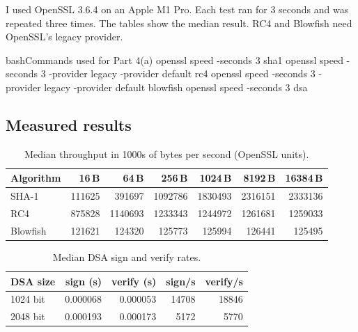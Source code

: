             I used OpenSSL 3.6.4 on an Apple M1 Pro. Each test ran for 3 seconds and was
            repeated three times. The tables show the median result. RC4 and Blowfish need
            OpenSSL's legacy provider.

            \begin{codeblock}[]{bash}{Commands used for Part 4(a)}
                openssl speed -seconds 3 sha1
                openssl speed -seconds 3 -provider legacy -provider default rc4
                openssl speed -seconds 3 -provider legacy -provider default blowfish
                openssl speed -seconds 3 dsa
            \end{codeblock}

        \subsection{Measured results}

            \begin{table}[h]
                \centering
                \small
                \begin{tabular}{lrrrrrr}
                    \toprule
                    Algorithm & 16\,B & 64\,B & 256\,B & 1024\,B & 8192\,B & 16384\,B \\
                    \midrule
                    SHA-1     & 111625 & 391697 & 1092786 & 1830493 & 2316151 & 2333136 \\
                    RC4       & 875828 & 1140693 & 1233343 & 1244972 & 1261681 & 1259033 \\
                    Blowfish  & 121621 & 124320 & 125773 & 125994 & 126441 & 125495 \\
                    \bottomrule
                \end{tabular}
                \caption{Median throughput in 1000s of bytes per second (OpenSSL units).}
                \label{tab:speed-sym}
            \end{table}

            \begin{table}[h]
                \centering
                \begin{tabular}{lrrrr}
                    \toprule
                    DSA size & sign (s) & verify (s) & sign/s & verify/s \\
                    \midrule
                    1024 bit & 0.000068 & 0.000053 & 14708 & 18846 \\
                    2048 bit & 0.000193 & 0.000173 & 5172 & 5770 \\
                    \bottomrule
                \end{tabular}
                \caption{Median DSA sign and verify rates.}
                \label{tab:speed-dsa}
            \end{table}

